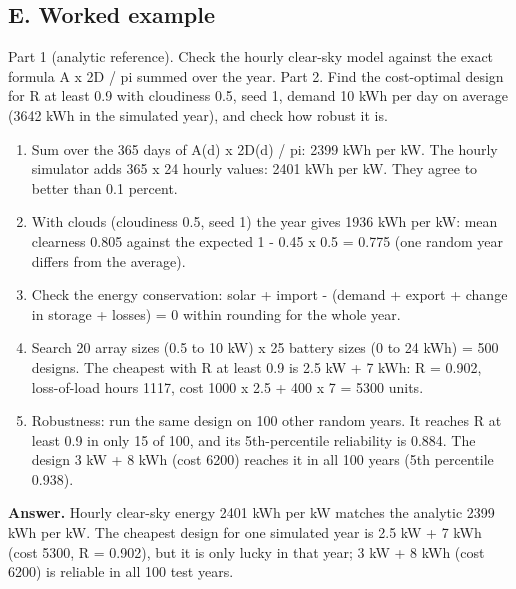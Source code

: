 \documentclass[11pt,a4paper]{article}
\begin{document}
\subsection*{E. Worked example}
Part 1 (analytic reference). Check the hourly clear-sky model against the exact formula A x 2D / pi summed over the year. Part 2. Find the cost-optimal design for R at least 0.9 with cloudiness 0.5, seed 1, demand 10 kWh per day on average (3642 kWh in the simulated year), and check how robust it is.
\begin{enumerate}[nosep]
\item Sum over the 365 days of A(d) x 2D(d) / pi: 2399 kWh per kW. The hourly simulator adds 365 x 24 hourly values: 2401 kWh per kW. They agree to better than 0.1 percent.
\item With clouds (cloudiness 0.5, seed 1) the year gives 1936 kWh per kW: mean clearness 0.805 against the expected 1 - 0.45 x 0.5 = 0.775 (one random year differs from the average).
\item Check the energy conservation: solar + import - (demand + export + change in storage + losses) = 0 within rounding for the whole year.
\item Search 20 array sizes (0.5 to 10 kW) x 25 battery sizes (0 to 24 kWh) = 500 designs. The cheapest with R at least 0.9 is 2.5 kW + 7 kWh: R = 0.902, loss-of-load hours 1117, cost 1000 x 2.5 + 400 x 7 = 5300 units.
\item Robustness: run the same design on 100 other random years. It reaches R at least 0.9 in only 15 of 100, and its 5th-percentile reliability is 0.884. The design 3 kW + 8 kWh (cost 6200) reaches it in all 100 years (5th percentile 0.938).
\end{enumerate}
\textbf{Answer.} Hourly clear-sky energy 2401 kWh per kW matches the analytic 2399 kWh per kW. The cheapest design for one simulated year is 2.5 kW + 7 kWh (cost 5300, R = 0.902), but it is only lucky in that year; 3 kW + 8 kWh (cost 6200) is reliable in all 100 test years.
\end{document}
